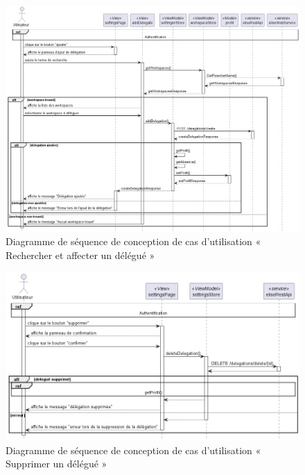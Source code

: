 \begin{figure}[H]
  \centering
  \includegraphics[width=1\textwidth]{out/diagrams/sprint6/sequence_search_affect_delegation/sequence_search_affect_delegation}
  \caption{Diagramme de séquence de conception de cas d'utilisation «  Rechercher et affecter un délégué »}
  \label{fig:conception_sequence_search_affect_delegation}
\end{figure}

\begin{figure}[H]
  \centering
  \includegraphics[width=1\textwidth]{out/diagrams/sprint6/sequence_annulation_delegation/sequence_annulation_delegation}
  \caption{Diagramme de séquence de conception de cas d'utilisation « Supprimer un délégué »}
  \label{fig:conception_sequence_annulation_delegation}
\end{figure}




